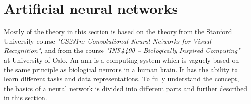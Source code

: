 \documentclass[USenglish]{ifimaster}  %
\begin{document}
\section{Artificial neural networks}
Mostly of the theory in this section is based on the theory from the Stanford University course \textit{"CS231n: Convolutional Neural Networks for Visual Recognition"}\cite{website:cs231n}, and from the course \textit{"INF4490 – Biologically Inspired Computing"}\cite{website:inf_4490_slp}\cite{website:inf_4490_mlp} at University of Oslo.
\newline
\newline
An \ac{ann} is a computing system which is vaguely based on the same principle as biological neurons in a human brain. It has the ability to learn different tasks and data representations. To fully understand the concept, the basics of a neural network is divided into different parts and further described in this section.
\newline
\newline
\end{document}
